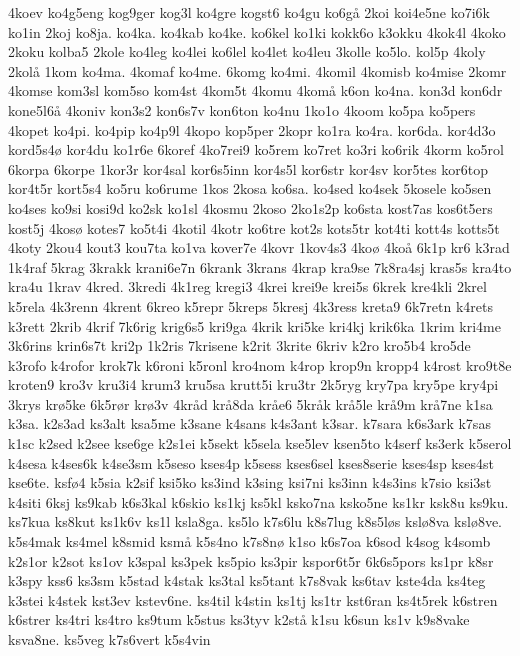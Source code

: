 4koev
ko4g5eng
kog9ger
kog3l
ko4gre
kogst6
ko4gu
ko6g^^e5
2koi
koi4e5ne
ko7i6k
ko1in
2koj
ko8ja.
ko4ka.
ko4kab
ko4ke.
ko6kel
ko1ki
kokk6o
k3okku
4kok4l
4koko
2koku
kolba5
2kole
ko4leg
ko4lei
ko6lel
ko4let
ko4leu
3kolle
ko5lo.
kol5p
4koly
2kol^^e5
1kom
ko4ma.
4komaf
ko4me.
6komg
ko4mi.
4komil
4komisb
ko4mise
2komr
4komse
kom3sl
kom5so
kom4st
4kom5t
4komu
4kom^^e5
k6on
ko4na.
kon3d
kon6dr
kone5l6^^e5
4koniv
kon3s2
kon6s7v
kon6ton
ko4nu
1ko1o
4koom
ko5pa
ko5pers
4kopet
ko4pi.
ko4pip
ko4p9l
4kopo
kop5per
2kopr
ko1ra
ko4ra.
kor6da.
kor4d3o
kord5s4^^f8
kor4du
ko1r6e
6koref
4ko7rei9
ko5rem
ko7ret
ko3ri
ko6rik
4korm
ko5rol
6korpa
6korpe
1kor3r
kor4sal
kor6s5inn
kor4s5l
kor6str
kor4sv
kor5tes
kor6top
kor4t5r
kort5s4
ko5ru
ko6rume
1kos
2kosa
ko6sa.
ko4sed
ko4sek
5kosele
ko5sen
ko4ses
ko9si
kosi9d
ko2sk
ko1sl
4kosmu
2koso
2ko1s2p
ko6sta
kost7as
kos6t5ers
kost5j
4kos^^f8
kotes7
ko5t4i
4kotil
4kotr
ko6tre
kot2s
kots5tr
kot4ti
kott4s
kotts5t
4koty
2kou4
kout3
kou7ta
ko1va
kover7e
4kovr
1kov4s3
4ko^^f8
4ko^^e5
6k1p
kr6
k3rad
1k4raf
5krag
3krakk
krani6e7n
6krank
3krans
4krap
kra9se
7k8ra4sj
kras5s
kra4to
kra4u
1krav
4kred.
3kredi
4k1reg
kregi3
4krei
krei9e
krei5s
6krek
kre4kli
2krel
k5rela
4k3renn
4krent
6kreo
k5repr
5kreps
5kresj
4k3ress
kreta9
6k7retn
k4rets
k3rett
2krib
4krif
7k6rig
krig6s5
kri9ga
4krik
kri5ke
kri4kj
krik6ka
1krim
kri4me
3k6rins
krin6s7t
kri2p
1k2ris
7krisene
k2rit
3krite
6kriv
k2ro
kro5b4
kro5de
k3rofo
k4rofor
krok7k
k6roni
k5ronl
kro4nom
k4rop
krop9n
kropp4
k4rost
kro9t8e
kroten9
kro3v
kru3i4
krum3
kru5sa
krutt5i
kru3tr
2k5ryg
kry7pa
kry5pe
kry4pi
3krys
kr^^f85ke
6k5r^^f8r
kr^^f83v
4kr^^e5d
kr^^e58da
kr^^e5e6
5kr^^e5k
kr^^e55le
kr^^e59m
kr^^e57ne
k1sa
k3sa.
k2s3ad
ks3alt
ksa5me
k3sane
k4sans
k4s3ant
k3sar.
k7sara
k6s3ark
k7sas
k1sc
k2sed
k2see
kse6ge
k2s1ei
k5sekt
k5sela
kse5lev
ksen5to
k4serf
ks3erk
k5serol
k4sesa
k4ses6k
k4se3sm
k5seso
kses4p
k5sess
kses6sel
kses8serie
kses4sp
kses4st
kse6te.
ksf^^f84
k5sia
k2sif
ksi5ko
ks3ind
k3sing
ksi7ni
ks3inn
k4s3ins
k7sio
ksi3st
k4siti
6ksj
ks9kab
k6s3kal
k6skio
ks1kj
ks5kl
ksko7na
ksko5ne
ks1kr
ksk8u
ks9ku.
ks7kua
ks8kut
ks1k6v
ks1l
ksla8ga.
ks5lo
k7s6lu
k8s7lug
k8s5l^^f8s
ksl^^f88va
ksl^^f88ve.
k5s4mak
ks4mel
k8smid
ksm^^e5
k5s4no
k7s8n^^f8
k1so
k6s7oa
k6sod
k4sog
k4somb
k2s1or
k2sot
ks1ov
k3spal
ks3pek
ks5pio
ks3pir
kspor6t5r
6k6s5pors
ks1pr
k8sr
k3spy
kss6
ks3sm
k5stad
k4stak
ks3tal
ks5tant
k7s8vak
ks6tav
kste4da
ks4teg
k3stei
k4stek
kst3ev
kstev6ne.
ks4til
k4stin
ks1tj
ks1tr
kst6ran
ks4t5rek
k6stren
k6strer
ks4tri
ks4tro
ks9tum
k5stus
ks3tyv
k2st^^e5
k1su
k6sun
ks1v
k9s8vake
ksva8ne.
ks5veg
k7s6vert
k5s4vin
